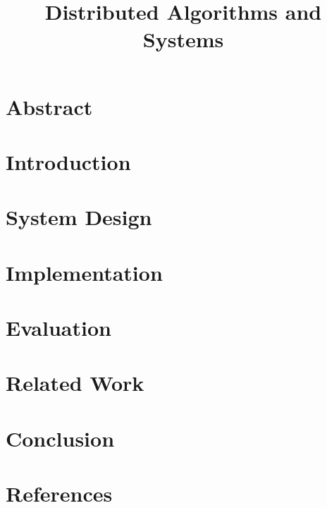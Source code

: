 \documentclass{article}
\title{Distributed Algorithms and Systems}
\begin{document}
\maketitle

\section{Abstract}

\section{Introduction}

\section{System Design}

\section{Implementation}

\section{Evaluation}

\section{Related Work}

\section{Conclusion}

\section{References}
\end{document}
